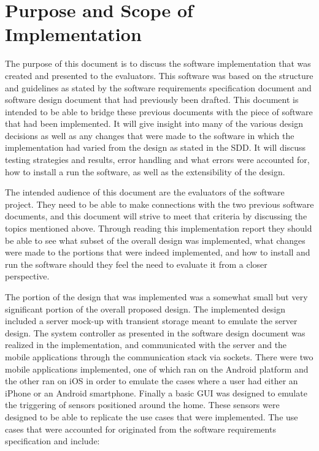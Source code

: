 \documentclass{article}
\begin{document}

\tableofcontents
\listoffigures

\section{Purpose and Scope of Implementation} %


The purpose of this document is to discuss the software implementation that was
created and presented to the evaluators. This software was based on the structure
and guidelines as stated by the software requirements specification document and
software design document that had previously been drafted. This document is
intended to be able to bridge these previous documents with the piece of software
that had been implemented. It will give insight into many of the various design
decisions as well as any changes that were made to the software in which the
implementation had varied from the design as stated in the SDD. It will discuss
testing strategies and results, error handling and what errors were accounted
for, how to install a run the software, as well as the extensibility of the design.

The intended audience of this document are the evaluators of the software project.
They need to be able to make connections with the two previous software documents,
and this document will strive to meet that criteria by discussing the topics mentioned
above. Through reading this implementation report they should be able to see
what subset of the overall design was implemented, what changes were made to
the portions that were indeed implemented, and how to install and run the software
should they feel the need to evaluate it from a closer perspective.

The portion of the design that was implemented was a somewhat small but very
significant portion of the overall proposed design. The implemented design
included a server mock-up with transient storage meant to emulate the server
design. The system controller as presented in the software design document was
realized in the implementation, and communicated with the server and the mobile
applications through the communication stack via sockets. There were two mobile
applications implemented, one of which ran on the Android platform and the other
ran on iOS in order to emulate the cases where a user had either an iPhone or an
Android smartphone. Finally a basic GUI was designed to emulate the triggering
of sensors positioned around the home. These sensors were designed to be able
to replicate the use cases that were implemented. The use cases that were
accounted for originated from the software requirements specification and include:
\end{document}
